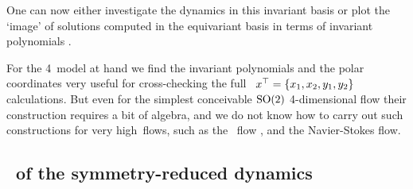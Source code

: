 \documentclass[aip,cha,
reprint,
secnumarabic,
nofootinbib, tightenlines,
nobibnotes, showkeys, showpacs,
groupedaddress,
]{revtex4-1}
\begin{document}
One can now either investigate the dynamics in this invariant basis or
plot the `image' of solutions computed in the equivariant
basis  in terms of invariant polynomials
.

For the 4\dmn\ model at hand we find the invariant polynomials
and the polar coordinates very useful for cross-checking the
full \statesp\ ${x}{}^\top = \{ x_1, x_2,y_1, y_2\}$ calculations.
But even
for the simplest conceivable $\textrm{SO}(2)$ 4-dimensional flow their
construction requires a bit of algebra, and we do not know
how to carry out such constructions for very high\dmn\ flows,
such as the \KS\ flow , and the Navier-Stokes flow.


\subsection{\Eqva\ of the symmetry-reduced dynamics}
\label{s:eqva}
\end{document}
